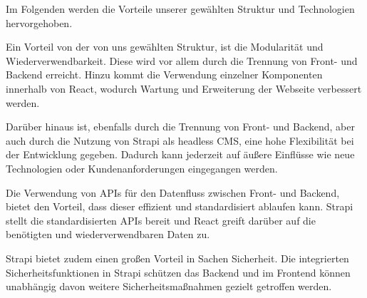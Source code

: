 Im Folgenden werden die Vorteile unserer gewählten Struktur und Technologien hervorgehoben.

Ein Vorteil von der von uns gewählten Struktur, ist die Modularität und Wiederverwendbarkeit. Diese wird vor allem durch die Trennung von Front- und Backend erreicht. Hinzu kommt die Verwendung einzelner Komponenten innerhalb von React, wodurch Wartung und Erweiterung der Webseite verbessert werden.

Darüber hinaus ist, ebenfalls durch die Trennung von Front- und Backend, aber auch durch die Nutzung von Strapi als headless CMS, eine hohe Flexibilität bei der Entwicklung gegeben. Dadurch kann jederzeit auf äußere Einflüsse wie neue Technologien oder Kundenanforderungen eingegangen werden.

Die Verwendung von APIs für den Datenfluss zwischen Front- und Backend, bietet den Vorteil, dass dieser effizient und standardisiert ablaufen kann. Strapi stellt die standardisierten APIs bereit und React greift darüber auf die benötigten und wiederverwendbaren Daten zu.

Strapi bietet zudem einen großen Vorteil in Sachen Sicherheit. Die integrierten Sicherheitsfunktionen in Strapi schützen das Backend und im Frontend können unabhängig davon weitere Sicherheitsmaßnahmen gezielt getroffen werden.
